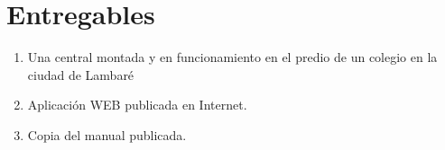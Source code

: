 \documentclass[11pt, spanish]{report}
\begin{document}
\section{Entregables}
\begin{enumerate}
\item Una central montada y en funcionamiento en el predio de un colegio en la ciudad de Lambaré
\item Aplicación WEB publicada en Internet.
\item Copia del manual publicada.
\end{enumerate}
\end{document}
